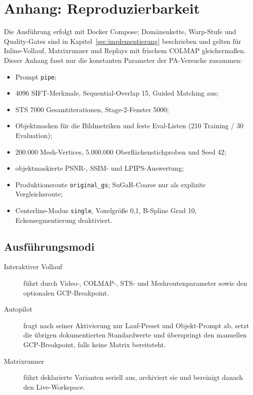 \section{Anhang: Reproduzierbarkeit}

Die Ausführung erfolgt mit Docker Compose; Domänenkette, Warp-Stufe und
Quality-Gates sind in Kapitel~\ref{sec:implementierung} beschrieben und gelten
für Inline-Vollauf, Matrixrunner und Replays mit frischem COLMAP gleichermaßen.
Dieser Anhang fasst nur die konstanten Parameter der PA-Versuche zusammen:

\begin{itemize}
  \item Prompt \texttt{pipe};
  \item 4096 SIFT-Merkmale, Sequential-Overlap 15, Guided Matching aus;
  \item STS 7000 Gesamtiterationen, Stage-2-Fenster 5000;
  \item Objektmasken für die Bildmetriken und feste Eval-Listen
        (210 Training / 30 Evaluation);
  \item 200.000 Mesh-Vertices, 5.000.000 Oberflächenstichproben und Seed 42;
  \item objektmaskierte PSNR-, SSIM- und LPIPS-Auswertung;
  \item Produktionsroute \texttt{original\_gs}; SuGaR-Coarse nur als
        explizite Vergleichsroute;
  \item Centerline-Modus \texttt{single}, Voxelgröße 0,1, B-Spline Grad 10,
        Eckensegmentierung deaktiviert.
\end{itemize}

\subsection*{Ausführungsmodi}

\begin{description}
  \item[Interaktiver Vollauf] führt durch Video-, COLMAP-, STS- und
    Meshroutenparameter sowie den optionalen GCP-Breakpoint.
  \item[Autopilot] fragt nach seiner Aktivierung nur Lauf-Preset und
    Objekt-Prompt ab, setzt die übrigen dokumentierten Standardwerte und
    überspringt den manuellen GCP-Breakpoint, falls keine Matrix bereitsteht.
  \item[Matrixrunner] führt deklarierte Varianten seriell aus, archiviert sie
    und bereinigt danach den Live-Workspace.
\end{description}

